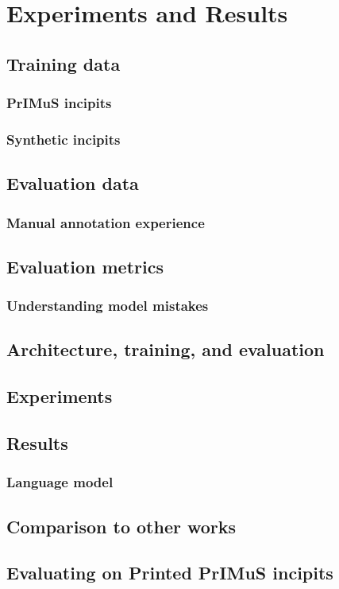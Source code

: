 \chapter{Experiments and Results}
\label{chap:ExperimentsAndResults}

\section{Training data}

\subsection{PrIMuS incipits}

\subsection{Synthetic incipits}

\section{Evaluation data}

\subsection{Manual annotation experience}

\section{Evaluation metrics}

\subsection{Understanding model mistakes}

\section{Architecture, training, and evaluation}
\label{sec:ArchitectureTrainingEvaluation}

\section{Experiments}

\section{Results}

\subsection{Language model}

\section{Comparison to other works}

\section{Evaluating on Printed PrIMuS incipits}
